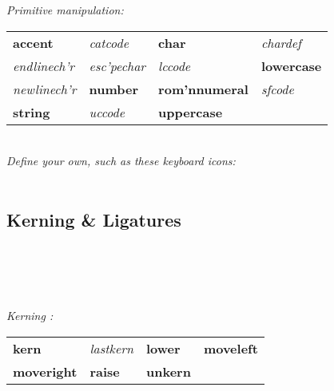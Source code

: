 \\
\\[1mm]
\textit{Primitive  manipulation:}\\
{\scriptsize\begin{tabular}{@{}l l l l}
    \textbf{accent}              &
    \textit{catcode}             &
    \textbf{char}                &
    \textit{chardef}             \\
    \textit{endlinech'r}         &
    \textit{esc'pechar}          &
    \textit{lccode}              &
    \textbf{lowercase}           \\
    \textit{newlinech'r}        &
    \textbf{number}              &
    \textbf{rom'nnumeral}        &
    \textit{sfcode}              \\
    \textbf{string}              &
    \textit{uccode}              &
    \textbf{uppercase}           &
\end{tabular}} \\
\textit{Define your own, such as these keyboard icons:}\\
\powerkey\,\returnkey\,\revreturnkey\,\esckey\,\tabkey\,\revtabkey\,\pencilkey\,\ejectkey\,\capslockkey\,\openapplekey\,\applekey\,\delkey\,\shiftkey\,\ctlkey\,\optkey\,\cmdkey\,



\subsection*{Kerning \& Ligatures}

 \\
 \\
 \\
 \\[1mm]
\textit{Kerning :}\\
{\footnotesize\begin{tabular}{@{}l l l l}
    \textbf{kern}            &
    \textit{lastkern}        &
    \textbf{lower}           &
    \textbf{moveleft}        \\
    \textbf{moveright}       &
    \textbf{raise}           &
    \textbf{unkern}          &
\end{tabular}} \\[1mm]
%
